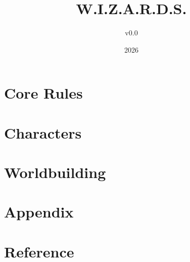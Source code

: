 \documentclass[openany]{wizards-book}
\title{W.I.Z.A.R.D.S.}
\author{\Large v0.0}
\date{2026}
\begin{document}
\maketitle
\makecopyright

\frontmatter


\tableofcontents


\mainmatter

\part{Core Rules}




\part{Characters}





\part{Worldbuilding}





\appendix
\part*{Appendix}










\backmatter

\part*{Reference}


\printglossary

\printindex 
\end{document}
